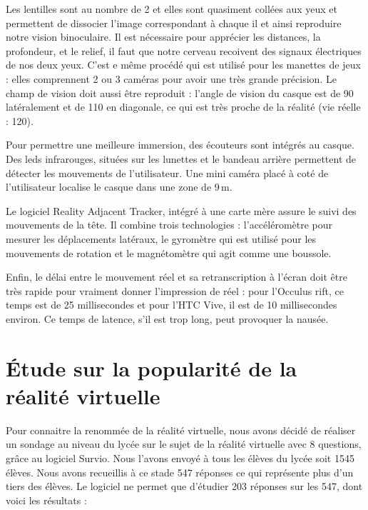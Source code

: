 \documentclass[12pt, a4paper]{report}
\begin{document}
Les lentilles sont au nombre de 2 et elles sont quasiment collées aux yeux et permettent de dissocier l'image correspondant à chaque il et ainsi reproduire notre vision binoculaire. Il est nécessaire pour apprécier les distances, la profondeur, et le relief, il faut que notre cerveau recoivent des signaux électriques de nos deux yeux. C'est e même procédé qui est utilisé pour les manettes de jeux : elles comprennent 2 ou 3 caméras pour avoir une très grande précision.
 Le champ de vision doit aussi être reproduit : l'angle de vision du casque est de 90\degres{} latéralement et de 110\degres{} en diagonale, ce qui est très proche de la réalité (vie réelle : 120\degres{}).

 Pour permettre une meilleure immersion, des écouteurs sont intégrés au casque.
Des leds infrarouges, situées sur les lunettes et le bandeau arrière permettent de détecter les mouvements de l'utilisateur. Une mini caméra placé à coté de l'utilisateur localise le casque dans une zone de 9\,m.

Le logiciel Reality Adjacent Tracker, intégré à une carte mère assure le suivi des mouvements de la tête. Il combine trois technologies : l'accéléromètre pour mesurer les déplacements latéraux, le gyromètre qui est utilisé pour les mouvements de rotation et le magnétomètre qui agit comme une boussole.

Enfin, le délai entre le mouvement réel et sa retranscription à l'écran doit être très rapide pour vraiment donner l'impression de réel : pour l'Occulus rift, ce temps est de 25 millisecondes et pour l'HTC Vive, il est de 10 millisecondes environ. Ce temps de latence, s'il est trop long, peut provoquer la nausée.

\section[\'{E}tude statistique]{\'{E}tude sur la popularité de la réalité virtuelle}

Pour connaitre la renommée de la réalité virtuelle, nous avons décidé de réaliser un sondage au niveau du lycée sur le sujet de la réalité virtuelle avec 8 questions, grâce au logiciel Survio. Nous l'avons envoyé à tous les élèves du lycée soit 1545 élèves. Nous avons recueillis à ce stade 547 réponses ce qui représente plus d'un tiers des élèves. Le logiciel ne permet que d'étudier 203 réponses sur les 547, dont voici les résultats :
\end{document}
